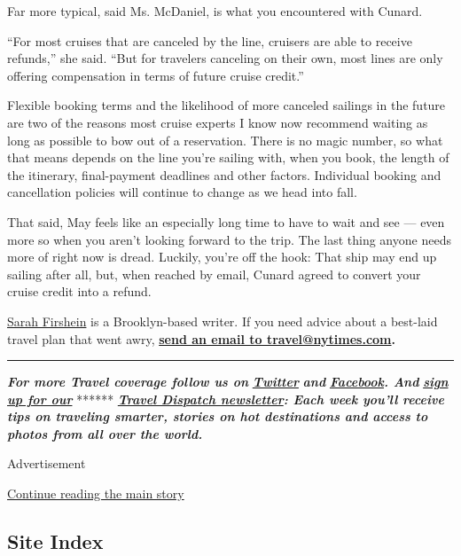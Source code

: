 Far more typical, said Ms. McDaniel, is what you encountered with
Cunard.

``For most cruises that are canceled by the line, cruisers are able to
receive refunds,'' she said. ``But for travelers canceling on their own,
most lines are only offering compensation in terms of future cruise
credit.''

Flexible booking terms and the likelihood of more canceled sailings in
the future are two of the reasons most cruise experts I know now
recommend waiting as long as possible to bow out of a reservation. There
is no magic number, so what that means depends on the line you're
sailing with, when you book, the length of the itinerary, final-payment
deadlines and other factors. Individual booking and cancellation
policies will continue to change as we head into fall.

That said, May feels like an especially long time to have to wait and
see --- even more so when you aren't looking forward to the trip. The
last thing anyone needs more of right now is dread. Luckily, you're off
the hook: That ship may end up sailing after all, but, when reached by
email, Cunard agreed to convert your cruise credit into a refund.

\href{https://twitter.com/sfirshein?lang=en}{Sarah Firshein} is a
Brooklyn-based writer. If you need advice about a best-laid travel plan
that went awry, \textbf{\href{mailto:travel@nytimes.com}{send an email
to travel@nytimes.com}.}

\begin{center}\rule{0.5\linewidth}{\linethickness}\end{center}

\emph{\textbf{For more Travel coverage follow us on}}
\textbf{\href{https://twitter.com/nytimestravel}{\emph{Twitter}}}
\emph{\textbf{and}}
\textbf{\href{https://www.facebook.com/nytimestravel/}{\emph{Facebook}}\emph{.
And}}
\textbf{\href{https://www.nytimes.com/newsletters/traveldispatch?action=click\&module=inline\&pgtype=Article}{\emph{sign
up for our}}} ******
\textbf{\href{https://www.nytimes.com/newsletters/traveldispatch}{\emph{Travel
Dispatch newsletter}}\emph{: Each week you'll receive tips on traveling
smarter, stories on hot destinations and access to photos from all over
the world.}}

Advertisement

\protect\hyperlink{after-bottom}{Continue reading the main story}

\hypertarget{site-index}{%
\subsection{Site Index}\label{site-index}}


